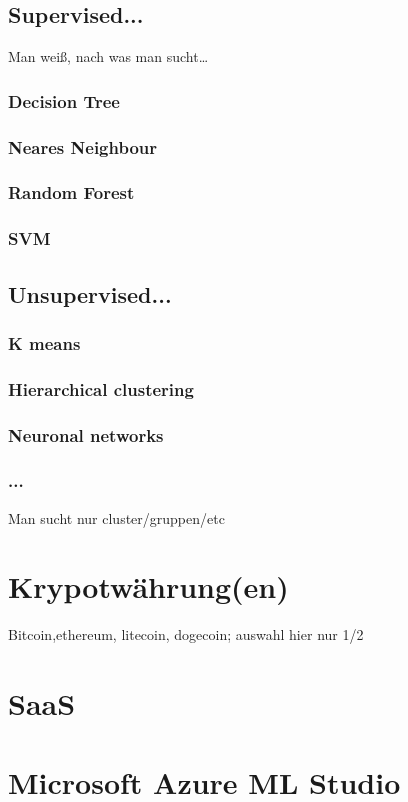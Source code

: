 \subsection{Supervised...}
Man weiß, nach was man sucht…
\subsubsection{Decision Tree}
\subsubsection{Neares Neighbour}
\subsubsection{Random Forest}
\subsubsection{SVM}
\subsection{Unsupervised...}
\subsubsection{K means}
\subsubsection{Hierarchical clustering}
\subsubsection{Neuronal networks}
\subsubsection{...}
Man sucht nur cluster/gruppen/etc




\section{Krypotwährung(en)}
Bitcoin,ethereum, litecoin, dogecoin; auswahl hier nur 1/2


\section{SaaS}
\section{Microsoft Azure ML Studio}
